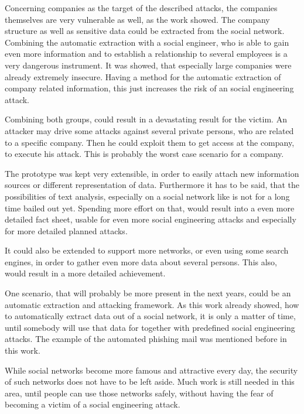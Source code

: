 Concerning companies as the target of the described attacks, the companies
themselves are very vulnerable as well, as the work showed. The company
structure as well as sensitive data could be extracted from the social network.
Combining the automatic extraction with a social engineer, who is able to gain
even more information and to establish a relationship to several employees is a
very dangerous instrument. It was showed, that especially large companies were
already extremely insecure. Having a method for the automatic extraction of
company related information, this just increases the risk of an social
engineering attack.

Combining both groups, could result in a devastating result for the victim. An
attacker may drive some attacks against several private persons, who are related to a
specific company. Then he could exploit them to get access at the company, to
execute his attack. This is probably the worst case scenario for a company.

The prototype was kept very extensible, in order to easily attach new
information sources or different representation of data. Furthermore it has to
be said, that the possibilities of text analysis, especially on a social
network like \Twitter{} is not for a long time bailed out yet. Spending more
effort on that, would result into a even more detailed fact sheet, usable for
even more social engineering attacks and especially for more detailed planned
attacks.

It could also be extended to support more networks, or even using some search
engines, in order to gather even more data about several persons. This also,
would result in a more detailed achievement.

One scenario, that will probably be more present in the next years, could be an
automatic extraction and attacking framework. As this work already showed, how
to automatically extract data out of a social network, it is only a matter of
time, until somebody will use that data for together with predefined social
engineering attacks. The example of the automated phishing mail was mentioned
before in this work.

While social networks become more famous and attractive every day, the security
of such networks does not have to be left aside. Much work is still needed in
this area, until people can use those networks safely, without having the fear
of becoming a victim of a social engineering attack.
